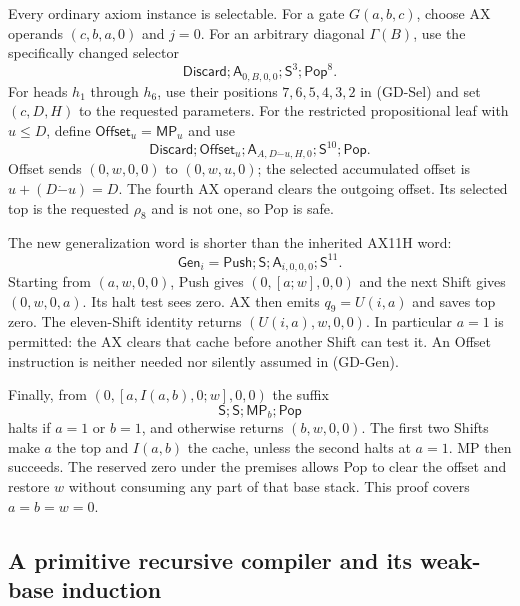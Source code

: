 Every ordinary axiom instance is selectable. For a gate $G(a,b,c)$,
choose AX operands $(c,b,a,0)$ and $j=0$. For an arbitrary diagonal
$\Gamma(B)$, use the specifically changed selector
\begin{equation}
 \mathsf{Discard};\mathsf A_{0,B,0,0};
                       \mathsf S^3;\mathsf{Pop}^8.         \tag{GD-Diag}
\end{equation}
For heads $h_1$ through $h_6$, use their positions $7,6,5,4,3,2$
in (GD-Sel) and set $(c,D,H)$ to the requested parameters. For the
restricted propositional leaf with $u\le D$, define
$\mathsf{Offset}_u=\mathsf{MP}_u$ and use
\begin{equation}
 \mathsf{Discard};\mathsf{Offset}_u;
 \mathsf A_{A,D\mathbin{\dot-}u,H,0};
                        \mathsf S^{10};\mathsf{Pop}.       \tag{GD-Rho}
\end{equation}
Offset sends $(0,w,0,0)$ to $(0,w,u,0)$; the selected accumulated
offset is $u+(D\mathbin{\dot-}u)=D$. The fourth AX operand clears
the outgoing offset. Its selected top is the requested $\rho_8$ and
is not one, so Pop is safe.

The new generalization word is shorter than the inherited AX11H word:
\begin{equation}
 \mathsf{Gen}_i=\mathsf{Push};\mathsf S;
                       \mathsf A_{i,0,0,0};\mathsf S^{11}. \tag{GD-Gen}
\end{equation}
Starting from $(a,w,0,0)$, Push gives $(0,[a;w],0,0)$ and the next
Shift gives $(0,w,0,a)$. Its halt test sees zero. AX then emits
$q_9=U(i,a)$ and saves top zero. The eleven-Shift identity returns
$(U(i,a),w,0,0)$. In particular $a=1$ is permitted: the AX clears
that cache before another Shift can test it. An Offset instruction is
neither needed nor silently assumed in (GD-Gen).

Finally, from $(0,[a,I(a,b),0;w],0,0)$ the suffix
\[
          \mathsf S;\mathsf S;\mathsf{MP}_b;\mathsf{Pop}
\]
halts if $a=1$ or $b=1$, and otherwise returns $(b,w,0,0)$.
The first two Shifts make $a$ the top and $I(a,b)$ the cache, unless
the second halts at $a=1$. MP then succeeds. The reserved zero under
the premises allows Pop to clear the offset and restore $w$ without
consuming any part of that base stack. This proof covers $a=b=w=0$.

\subsection{A primitive recursive compiler and its weak-base induction}


